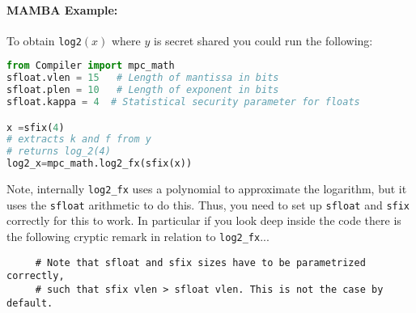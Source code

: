 \paragraph{MAMBA Example:} To obtain \verb|log2|$(x)$ where $y$ is secret shared you could run the following:
\begin{lstlisting}[language={python}]
from Compiler import mpc_math
sfloat.vlen = 15   # Length of mantissa in bits
sfloat.plen = 10   # Length of exponent in bits
sfloat.kappa = 4  # Statistical security parameter for floats

x =sfix(4)
# extracts k and f from y
# returns log_2(4)
log2_x=mpc_math.log2_fx(sfix(x))
\end{lstlisting}
Note, internally \verb+log2_fx+ uses a polynomial to approximate the logarithm, but it uses the \verb+sfloat+ arithmetic to do this.
Thus, you need to set up \verb+sfloat+ and \verb+sfix+ correctly for this to work.
In particular if you look deep inside the code there is the following cryptic remark in relation to \verb+log2_fx+...
\begin{verbatim}
     # Note that sfloat and sfix sizes have to be parametrized correctly,
     # such that sfix vlen > sfloat vlen. This is not the case by default.
\end{verbatim}


